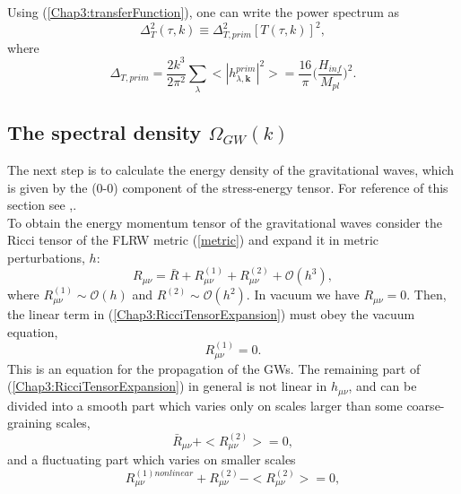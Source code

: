 \documentclass[11pt,a4paper,twoside]{book}
\begin{document}
Using (\ref{Chap3:transferFunction}), one can write the power spectrum as 
\begin{equation}
	\label{Chap3:powerSpectrumTransferFunction}
	\Delta_{T}^{2}(\tau,k) \equiv \Delta^{2}_{T,prim}[T(\tau,k)]^{2},
\end{equation}
where
\begin{equation}
	\label{Chap3:DeltaTPrim}
\Delta_{T,prim} = \frac{2k^{3}}{2\pi^{2}}\sum_{\lambda}<|h^{prim}_{\lambda,\mathbf{k}}|^{2}> = \frac{16}{\pi} \Big (\frac{H_{inf}}{M_{pl}}\Big)^{2}.
\end{equation}

\subsection{The spectral density $\Omega_{GW}(k)$}
The next step is to calculate the energy density of the gravitational waves, which is given by the (0-0) component of the stress-energy tensor. For reference of this section see \cite{Chap3:GW_Watanabe_Komatsu},\cite{Chap3: Gravitation}.\\
To obtain the energy momentum tensor of the gravitational waves consider the Ricci tensor of the FLRW metric (\ref{metric}) and expand it in metric perturbations, $ h $:
\begin{equation}
	\label{Chap3:RicciTensorExpansion}
	R_{\mu\nu} = \bar{R} + R^{(1)}_{\mu\nu} + R^{(2)}_{\mu\nu} + \mathcal{O}(h^{3}),
\end{equation}
where  $ R^{(1)}_{\mu\nu} \sim \mathcal{O}(h) $ and $ R^{(2)} \sim \mathcal{O}(h^{2}) $. In  vacuum we have $ R_{\mu\nu} = 0 $. Then, the linear term in (\ref{Chap3:RicciTensorExpansion}) must obey the vacuum equation,
\begin{equation} 
\label{Chap3:linearVacuumEquation}
	R^{(1)}_{\mu\nu} = 0.
\end{equation}
This is an equation for the propagation of the GWs. The remaining part of (\ref{Chap3:RicciTensorExpansion}) in general is not linear in $ h_{\mu\nu} $, and can be divided into a smooth part which varies only on scales larger than some coarse-graining scales,
\begin{equation}
	\label{Chap3:EqRicciTensor}
	\bar{R}_{\mu\nu} + <R_{\mu\nu}^{(2)}> = 0, 
\end{equation}
and a fluctuating part which varies on smaller scales
\begin{equation}
	\label{Chap3:RicciEquationFluctuating part}
	R_{\mu\nu}^{(1)nonlinear} + R^{(2)}_{\mu\nu} - <R^{(2)}_{\mu\nu}> = 0,
\end{equation}
\end{document}
